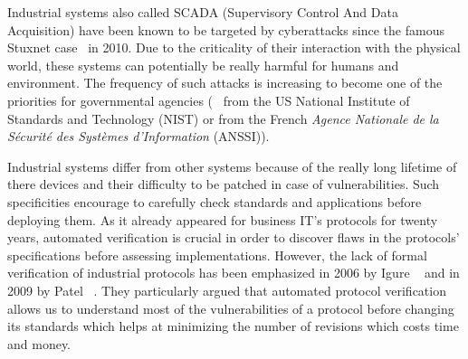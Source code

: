 Industrial systems also called SCADA (Supervisory Control And Data
Acquisition) have been known to be targeted by cyberattacks since the
famous Stuxnet case~\cite{Lan11} in 2010.  Due to the criticality of
their interaction with the physical world, these systems can
potentially be really harmful for humans and environment.  The
frequency of such attacks is increasing to become one of the priorities for
governmental agencies (\eg~\cite{SFS11} from the US National Institute of
Standards and Technology (NIST) or
\cite{ANSSI12_guide_securite_industrielle_en} from the French {\em Agence
Nationale de la Sécurité des Systèmes d'Information} (ANSSI)).


Industrial systems differ from other systems because of
the really long lifetime of there devices and their difficulty to
be patched in case of vulnerabilities.
Such specificities encourage to carefully check
standards and applications before deploying them.
As it already appeared for business IT's protocols for twenty years,
automated verification is crucial in order to discover flaws in the
protocols' specifications before assessing implementations. However,
the lack of formal verification of industrial protocols has been
emphasized in 2006 by Igure \etal~\cite{ILW06} and in 2009 by
Patel \emph{\etal}~\cite{PBG09}.  They particularly argued that
automated protocol verification allows us to understand most of the
vulnerabilities of a protocol before changing its standards which
helps at minimizing the number of revisions which costs time and
money. 

